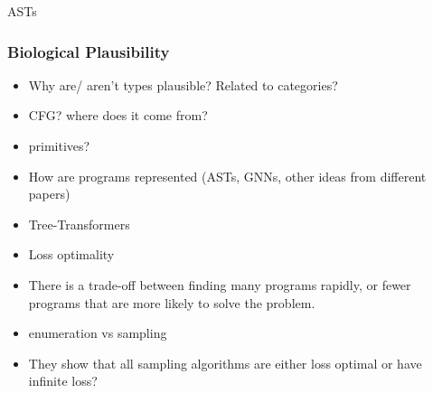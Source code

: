 
\cite{gulwani_program_2017}

ASTs
\cite{oliveira_abstract_2013}
\cite{zhang_novel_2019}












\subsubsection{Biological Plausibility}
\begin{itemize}
    \item Why are/ aren't types plausible? Related to categories?
    \item CFG? where does it come from?
    \item primitives?
\end{itemize}



\begin{itemize}
    \item How are programs represented (ASTs, GNNs, other ideas from different papers)
    \item Tree-Transformers
\end{itemize}











\begin{itemize}
    \item Loss optimality
    \item There is a trade-off between finding many programs rapidly, or fewer programs that are more likely to solve the problem.
    \item enumeration vs sampling
    \item They show that all sampling algorithms are either loss optimal or have infinite loss?
\end{itemize}












